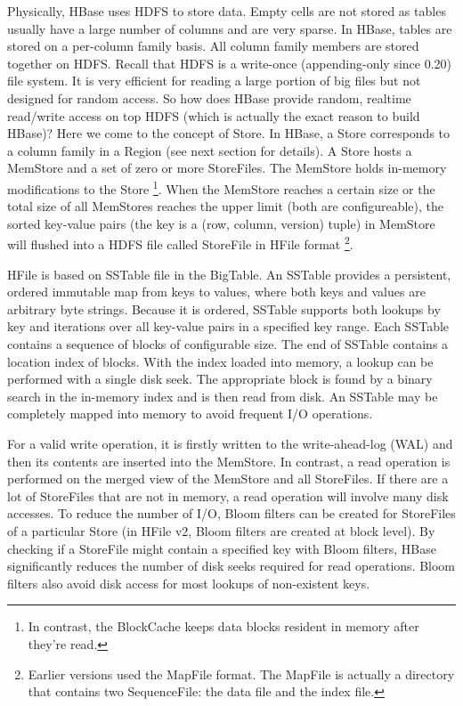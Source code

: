 \documentclass[11pt]{book}
\begin{document}
Physically, HBase uses HDFS to store data. Empty cells are not stored as tables usually have a large number of columns and are very sparse. In HBase, tables are stored on a per-column family basis. All column family members are stored together on HDFS. 
Recall that HDFS is a write-once (appending-only since 0.20) file system. It is very efficient for reading a large portion of  big files but not designed for random access. So how does HBase provide random, realtime read/write access on top HDFS (which is actually the exact reason to build HBase)? Here we come to the concept of Store. In HBase, a Store corresponds to a column family in a Region (see next section for details). A Store hosts a MemStore and a set of zero or more StoreFiles. The MemStore holds in-memory modifications to the Store \footnote{In contrast, the BlockCache keeps data blocks resident in memory after they're read.}. When the MemStore reaches a certain size or the total size of all MemStores reaches the upper limit (both are configureable), the sorted key-value pairs (the key is a (row, column, version) tuple) in MemStore will flushed into a HDFS file called StoreFile in HFile format \footnote{Earlier versions used the MapFile format. The MapFile is actually a directory that contains two SequenceFile: the data file and the index file. }.

HFile is based on SSTable file in the BigTable. An SSTable provides a persistent, ordered immutable map from keys to values, where both keys and values are arbitrary byte strings. Because it is ordered, SSTable supports both lookups by key and iterations over all key-value pairs in a specified key range. Each SSTable contains a sequence of blocks of configurable size. The end of SSTable contains a location index of blocks. With the index loaded into memory, a lookup can be performed with a single disk seek. The appropriate block is found by a binary search in the in-memory index and is then read from disk. An SSTable may be completely mapped into memory to avoid frequent I/O operations.

For a valid write operation, it is firstly written to the write-ahead-log (WAL) and then its contents are inserted into the MemStore. In contrast, a read operation is performed on the merged view of the MemStore and all StoreFiles. If there are a lot of StoreFiles that are not in memory, a read operation will involve many disk accesses. To reduce the number of I/O, Bloom filters \cite{Bloom:1970:STH} can be created for StoreFiles of a particular Store (in HFile v2, Bloom filters are created at block level). By checking if a StoreFile might contain a specified key with Bloom filters, HBase significantly reduces the number of disk seeks required for read operations. Bloom filters also avoid disk access for most lookups of non-existent keys.
\end{document}
